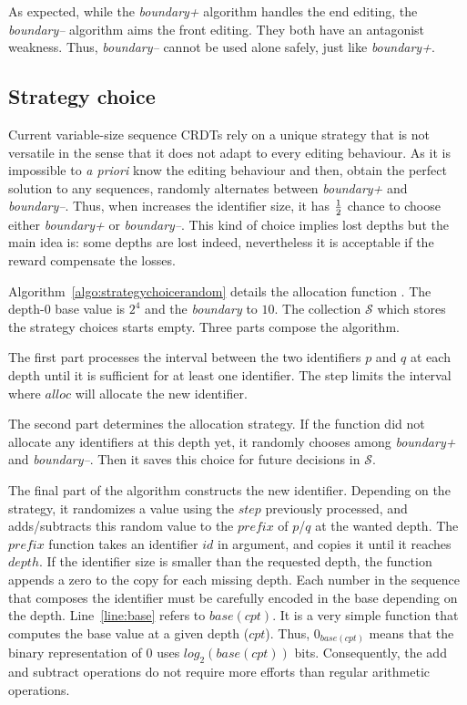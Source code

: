

As expected, while the \emph{boundary+} algorithm handles the end editing,
the \emph{boundary--} algorithm aims the front editing. They both have
an antagonist weakness. Thus, \emph{boundary--} cannot be used alone safely,
just like \emph{boundary+}.

\subsection{Strategy choice}

Current variable-size sequence CRDTs rely on a unique strategy that is not
versatile in the sense that it does not adapt to every editing behaviour. As it
is impossible to \emph{a priori} know the editing behaviour and then, obtain
the perfect solution to any sequences, \NAME{} randomly alternates between
\emph{boundary+} and \emph{boundary--}. Thus, when \NAME{} increases the
identifier size, it has $1\over{2}$ chance to choose either \emph{boundary+} or
\emph{boundary--}. This kind of choice implies lost depths but the main idea
is: some depths are lost indeed, nevertheless it is acceptable if the reward
compensate the losses.



Algorithm~\ref{algo:strategychoicerandom} details the allocation function
\NAME{}. The depth-0 base value is $2^4$ and the \emph{boundary} to $10$. The
collection $\mathcal{S}$ which stores the strategy choices starts empty. Three
parts compose the algorithm.
\begin{inparaenum}[(1)]
  \item The first part processes the interval between the two identifiers $p$
    and $q$ at each depth until it is sufficient for at least one
    identifier. The step limits the interval where $alloc$ will allocate the
    new identifier.
  \item The second part determines the allocation strategy. If the function did
    not allocate any identifiers at this depth yet, it randomly chooses among
    \emph{boundary+} and \emph{boundary--}. Then it saves this choice for
    future decisions in $\mathcal{S}$.
  \item The final part of the algorithm constructs the new
    identifier. Depending on the strategy, it randomizes a value using the
    $step$ previously processed, and adds/subtracts this random value to the
    $prefix$ of $p$/$q$ at the wanted depth. The $prefix$ function takes an
    identifier $id$ in argument, and copies it until it reaches $depth$. If the
    identifier size is smaller than the requested depth, the function appends a
    zero to the copy for each missing depth. Each number in the sequence that
    composes the identifier must be carefully encoded in the base depending on
    the depth. Line~\ref{line:base} refers to $base(cpt)$. It is a very simple
    function that computes the base value at a given depth ($cpt$). Thus,
    $0_{base(cpt)}$ means that the binary representation of $0$ uses
    $log_2(base(cpt))$ bits. Consequently, the add and subtract operations do
    not require more efforts than regular arithmetic operations.
\end{inparaenum}

